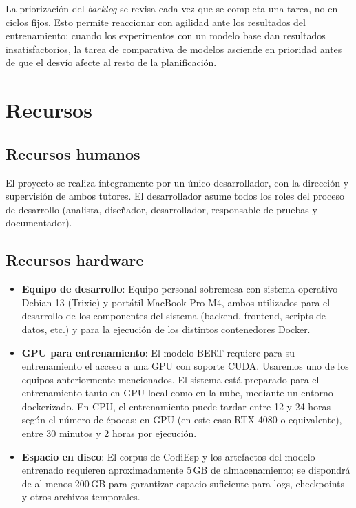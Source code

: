 La priorización del \emph{backlog} se revisa cada vez que se completa una tarea, no en ciclos fijos. Esto permite reaccionar con agilidad ante los resultados del entrenamiento: cuando los experimentos con un modelo base dan resultados insatisfactorios, la tarea de comparativa de modelos asciende en prioridad antes de que el desvío afecte al resto de la planificación.

\section{Recursos}

\subsection{Recursos humanos}

El proyecto se realiza íntegramente por un único desarrollador, con la dirección y supervisión de ambos tutores. El desarrollador asume todos los roles del proceso de desarrollo (analista, diseñador, desarrollador, responsable de pruebas y documentador).

\subsection{Recursos hardware}

\begin{itemize}
 \item \textbf{Equipo de desarrollo}: Equipo personal sobremesa con sistema operativo Debian 13 (Trixie) y portátil MacBook Pro M4, ambos utilizados para el desarrollo de los componentes del sistema (backend, frontend, scripts de datos, etc.) y para la ejecución de los distintos contenedores Docker.
 \item \textbf{GPU para entrenamiento}: El modelo BERT requiere para su entrenamiento el acceso a una GPU con soporte CUDA. Usaremos uno de los equipos anteriormente mencionados. El sistema está preparado para el entrenamiento tanto en GPU local como en la nube, mediante un entorno dockerizado. En CPU, el entrenamiento puede tardar entre 12 y 24 horas según el número de épocas; en GPU (en este caso RTX 4080 o equivalente), entre 30 minutos y 2 horas por ejecución.
 \item \textbf{Espacio en disco}: El corpus de CodiEsp y los artefactos del modelo entrenado requieren aproximadamente 5\,GB de almacenamiento; se dispondrá de al menos 200\,GB para garantizar espacio suficiente para logs, checkpoints y otros archivos temporales.
\end{itemize}

